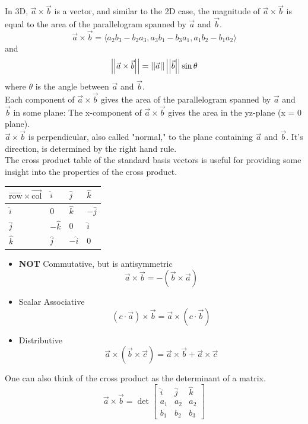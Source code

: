 \noindent
In 3D, $\vec{a}\times\vec{b}$ is a vector, and similar to the 2D case, the magnitude of $\vec{a}\times\vec{b}$ is equal to the area of the parallelogram spanned by $\vec{a}$ and $\vec{b}$.
\begin{equation*}
	\vec{a}\times\vec{b} = \langle a_2b_3-b_2a_3,a_3b_1-b_3a_1,a_1b_2-b_1a_2 \rangle
\end{equation*}
and
\begin{equation*}
	\left|\left|\vec{a}\times\vec{b}\right|\right|=\left|\left|\vec{a}\right|\right|\left|\left|\vec{b}\right|\right|\sin{\theta}
\end{equation*}
where $\theta$ is the angle between $\vec{a}$ and $\vec{b}$.\\
Each component of $\vec{a}\times\vec{b}$ gives the area of the parallelogram spanned by $\vec{a}$ and $\vec{b}$ in some plane: The x-component of $\vec{a}\times\vec{b}$ gives the area in the yz-plane (x = 0 plane).\\
$\vec{a}\times\vec{b}$ is perpendicular, also called "normal," to the plane containing $\vec{a}$ and $\vec{b}$. It's direction, is determined by the right hand rule.\\

\noindent
The cross product table of the standard basis vectors is useful for providing some insight into the properties of the cross product.
\begin{table}[h]
	\centering
	\renewcommand{\arraystretch}{1.5}
	\begin{tabular}{|l|l|l|l|}
		\hline
		$\overrightarrow{\text{row}}\times\overrightarrow{\text{col}}$ & $\hat{i}$  & $\hat{j}$  & $\hat{k}$  \\ \hline
		$\hat{i}$                                & $0$        & $\hat{k}$  & $-\hat{j}$ \\ \hline
		$\hat{j}$                                & $-\hat{k}$ & $0$        & $\hat{i}$  \\ \hline
		$\hat{k}$                                & $\hat{j}$  & $-\hat{i}$ & $0$        \\ \hline
	\end{tabular}
\end{table}

\begin{itemize}
	\item \textbf{NOT} Commutative, but is antisymmetric
	\begin{equation*}
		\vec{a}\times\vec{b} = -\left(\vec{b}\times\vec{a}\right)
	\end{equation*}
	\item Scalar Associative
	\begin{equation*}
		\left(c\cdot\vec{a}\right)\times\vec{b}=\vec{a}\times\left(c\cdot\vec{b}\right)
	\end{equation*}
	\item Distributive
	\begin{equation*}
		\vec{a}\times\left(\vec{b}\times\vec{c}\right) = \vec{a}\times\vec{b} + \vec{a}\times\vec{c}
	\end{equation*}
\end{itemize}

\noindent
One can also think of the cross product as the determinant of a matrix.
\begin{equation*}
	\vec{a}\times\vec{b} = \det\begin{bmatrix}
		\hat{i}& \hat{j} & \hat{k} \\
		a_1 & a_2 & a_2\\
		b_1 & b_2 & b_3 
	\end{bmatrix}
\end{equation*}